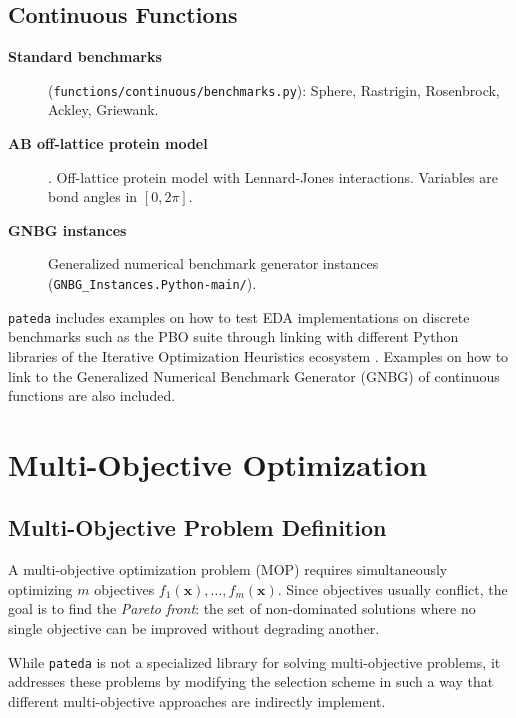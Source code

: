 \documentclass[a4paper,11pt]{article}
\begin{document}
\subsection{Continuous Functions}

\begin{description}
  \item[\textbf{Standard benchmarks}] (\texttt{functions/continuous/benchmarks.py}):
    Sphere, Rastrigin, Rosenbrock, Ackley, Griewank.

  \item[\textbf{AB off-lattice protein model}] \citep{Larranhaga_et_al:1999}.
    Off-lattice protein model with Lennard-Jones interactions.
    Variables are bond angles in $[0, 2\pi]$.

  \item[\textbf{GNBG instances}] \citep{Yazdani_et_al:2023}
    Generalized numerical benchmark generator instances
    (\texttt{GNBG\_Instances.Python-main/}).
\end{description}

\texttt{pateda} includes examples on how to test EDA implementations on discrete benchmarks such as the PBO suite \cite{Doerr_et_al:2019} through linking with different Python libraries of the Iterative Optimization Heuristics ecosystem \cite{Vermetten_et_al:2024}. Examples on how to link to the   Generalized Numerical Benchmark Generator (GNBG) of continuous functions\citep{Yazdani_et_al:2023} are also included.

\section{Multi-Objective Optimization}
\label{sec:multiobjective}

\subsection{Multi-Objective Problem Definition}

A multi-objective optimization problem (MOP) \citep{Deb:2001} requires simultaneously optimizing $m$ objectives $f_1(\mathbf{x}), \ldots, f_m(\mathbf{x})$. Since objectives usually conflict, the goal is to find the \emph{Pareto front}: the set of non-dominated solutions where no single objective can be improved without degrading another.

While \texttt{pateda} is not a specialized library for solving multi-objective problems, it addresses these problems by modifying the selection scheme in such a way that different multi-objective approaches are indirectly implement.
\end{document}
